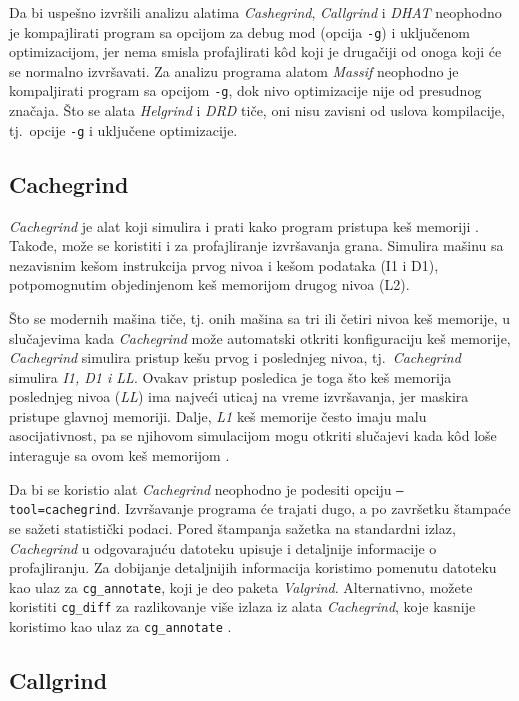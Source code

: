 \documentclass[12pt,oneside]{memoir}
\theoremstyle{plain}
\theoremstyle{definition}
\begin{document}
Da bi uspešno izvršili analizu alatima \textit{Cashegrind}, \textit{Callgrind} i \textit{DHAT} neophodno je kompajlirati program sa opcijom za debug mod (opcija \texttt{-g}) i uključenom optimizacijom, jer nema smisla profajlirati k\^od koji je drugačiji od onoga koji će se normalno izvršavati. Za analizu programa alatom \textit{Massif} neophodno je kompaljirati program sa opcijom \texttt{-g}, dok nivo optimizacije nije od presudnog značaja. Što se alata \textit{Helgrind} i \textit{DRD} tiče, oni nisu zavisni od uslova kompilacije, tj.~opcije \texttt{-g} i uključene optimizacije.

\subsection{Cachegrind}
\textit{Cachegrind} je alat koji simulira i prati kako program pristupa keš memoriji \cite{Cachegrind}. Takođe, može se koristiti i za profajliranje izvršavanja grana. Simulira mašinu sa nezavisnim kešom instrukcija prvog nivoa i kešom podataka (I1 i D1), potpomognutim objedinjenom keš memorijom drugog nivoa (L2). 

Što se modernih mašina tiče, tj. onih mašina sa tri ili četiri nivoa keš memorije, u slučajevima kada \textit{Cachegrind} može automatski otkriti konfiguraciju keš memorije, \textit{Cachegrind} simulira pristup kešu prvog i poslednjeg nivoa, tj.~\textit{Cachegrind} simulira \textit{I1, D1 i LL}. Ovakav pristup posledica je toga što keš memorija poslednjeg nivoa (\textit{LL}) ima najveći uticaj na vreme izvršavanja, jer maskira pristupe glavnoj memoriji. Dalje, \textit{L1} keš memorije često imaju malu asocijativnost, pa se njihovom simulacijom mogu otkriti slučajevi kada k\^od loše interaguje sa ovom keš memorijom \cite{Cachegrind}.

Da bi se koristio alat \textit{Cachegrind} neophodno je podesiti opciju \texttt{–tool=cachegrind}. Izvršavanje programa će trajati dugo, a po završetku štampaće se sažeti statistički podaci. Pored štampanja sažetka na standardni izlaz, \textit{Cachegrind} u odgovarajuću datoteku upisuje i detaljnije informacije o profajliranju. Za dobijanje detaljnijih informacija koristimo pomenutu datoteku kao ulaz za \texttt{cg\_annotate}, koji je deo paketa \textit{Valgrind}. Alternativno, možete koristiti \texttt{cg\_diff} za razlikovanje više izlaza iz alata \textit{Cachegrind}, koje kasnije koristimo kao ulaz za \texttt{cg\_annotate} \cite{Cachegrind}.

\subsection{Callgrind}
\end{document}

